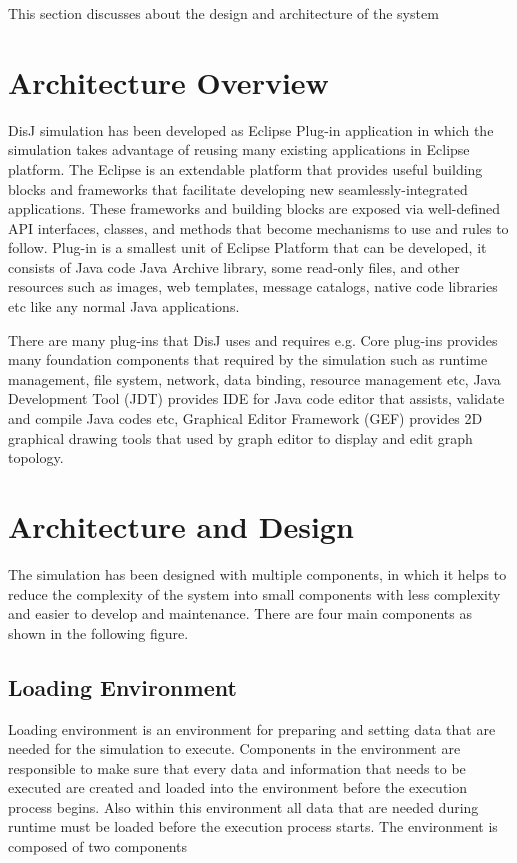 
This section discusses about the design and architecture of the system


\section{Architecture Overview}

DisJ simulation has been developed as Eclipse Plug-in application in which the simulation takes advantage of reusing many existing applications in Eclipse platform. The Eclipse is an extendable platform that provides useful building blocks and frameworks that facilitate developing new seamlessly-integrated applications. These frameworks and building blocks are exposed via well-defined API interfaces, classes, and methods that become mechanisms to use and rules to follow. Plug-in is a smallest unit of Eclipse Platform that can be developed, it consists of Java code Java Archive library, some read-only files, and other resources such as images, web templates, message catalogs, native code libraries etc like any normal Java applications.

There are many plug-ins that DisJ uses and requires e.g. Core plug-ins provides many foundation components that required by the simulation such as runtime management, file system, network, data binding, resource management etc, Java Development Tool (JDT) provides IDE for Java code editor that assists, validate and compile Java codes etc, Graphical Editor Framework (GEF) provides 2D graphical drawing tools that used by graph editor to display and edit graph topology.



\section{Architecture and Design}

The simulation has been designed with multiple components, in which it helps to reduce the complexity of the system into small components with less complexity and easier to develop and maintenance. There are four main components as shown in the following figure.


\subsection{Loading Environment}

Loading environment is an environment for preparing and setting data that are needed for the simulation to execute. Components in the environment are responsible to make sure that every data and information that needs to be executed are created and loaded into the environment before the execution process begins. Also within this environment all data that are needed during runtime must be loaded before the execution process starts. The environment is composed of two components


